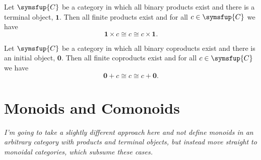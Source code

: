 \documentclass[fleqn]{NotesClass}
\newcommand{\cat}[1]{\symsfup{#1}}
\newcommand{\initial}{\symbf{0}}
\newcommand{\terminal}{\symbf{1}}
\newcommand{\isomorphic}{\cong}
\begin{document}
    \begin{prp}{}{}
        Let \(\cat{C}\) be a category in which all binary products exist and there is a terminal object, \(\terminal\).
        Then all finite products exist and for all \(c \in \cat{C}\) we have
        \begin{equation}
            \terminal \times c \isomorphic c \isomorphic c \times \terminal.
        \end{equation}
        
        Let \(\cat{C}\) be a category in which all binary coproducts exist and there is an initial object, \(\initial\).
        Then all finite coproducts exist and for all \(c \in \cat{C}\) we have
        \begin{equation}
            \initial + c \isomorphic c \isomorphic c + \initial.
        \end{equation}
    \end{prp}
    
    \section{Monoids and Comonoids}
    \textit{I'm going to take a slightly different approach here and not define monoids in an arbitrary category with products and terminal objects, but instead move straight to monoidal categories, which subsume these cases.}
    
\end{document}

